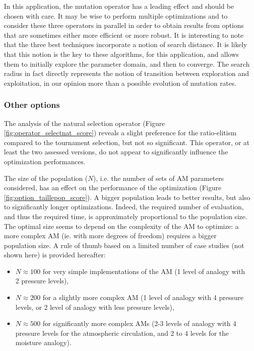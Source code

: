 \documentclass{ametsoc}
\begin{document}
In this application, the mutation operator has a leading effect and should be chosen with care. It may be wise to perform multiple optimizations and to consider these three operators in parallel in order to obtain results from options that are sometimes either more efficient or more robust. It is interesting to note that the three best techniques incorporate a notion of search distance. It is likely that this notion is the key to these algorithms, for this application, and allows them to initially explore the parameter domain, and then to converge. The search radius in fact directly represents the notion of transition between exploration and exploitation, in our opinion more than a possible evolution of mutation rates.


\subsubsection{Other options}

The analysis of the natural selection operator (Figure \ref{fig:operator_selectnat_score}) reveals a slight preference for the ratio-elitism compared to the tournament selection, but not so significant. This operator, or at least the two assessed versions, do not appear to significantly influence the optimization performances.

The size of the population ($N$), i.e. the number of sets of AM parameters considered, has an effect on the performance of the optimization (Figure \ref{fig:option_taillepop_score}). A bigger population leads to better results, but also to significantly longer optimizations. Indeed, the required number of evaluation, and thus the required time, is approximately proportional to the population size. The optimal size seems to depend on the complexity of the AM to optimize: a more complex AM (ie. with more degrees of freedom) requires a bigger population size. A rule of thumb based on a limited number of case studies (not shown here) is provided hereafter:

\begin{itemize}
	\item $N\approx100$ for very simple implementations of the AM (1 level of analogy with 2 pressure levels),
	\item $N\approx200$ for a slightly more complex AM (1 level of analogy with 4 pressure levels, or 2 level of analogy with less pressure levels),
	\item $N\approx500$ for significantly more complex AMs (2-3 levels of analogy with 4 pressure levels for the atmospheric circulation, and 2 to 4 levels for the moisture analogy).
\end{itemize}
\end{document}
